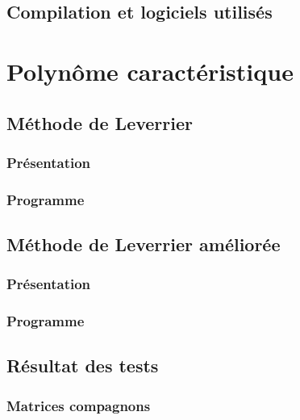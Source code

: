 \documentclass{report}
\begin{document}

% 
\newpage


    \section{Compilation et logiciels utilisés}
  \chapter{Polynôme caractéristique}
    \section{Méthode de Leverrier}
      \subsection{Présentation}
      \subsection{Programme}
	
    \section{Méthode de Leverrier améliorée}
      \subsection{Présentation}
      \subsection{Programme}
	
    \section{Résultat des tests}
      \subsection{Matrices compagnons}
\end{document}
